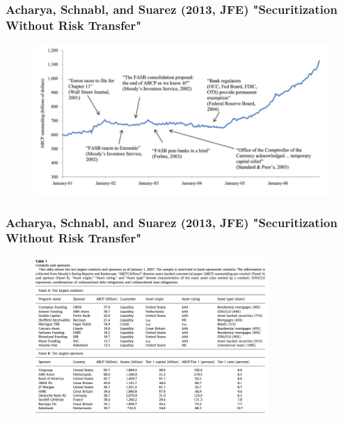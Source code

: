 \documentclass[11pt]{beamer}
\begin{document}
\begin{frame}
	\frametitle{Acharya, Schnabl, and Suarez (2013, JFE) "Securitization Without Risk Transfer"}
    \begin{figure}
    	\begin{center}
    	\includegraphics[width=\textwidth]{Figures/ASS2013_Figure2.png}
        \end{center}
    \end{figure}
\end{frame}

\begin{frame}
	\frametitle{Acharya, Schnabl, and Suarez (2013, JFE) "Securitization Without Risk Transfer"}
    \begin{figure}
    	\begin{center}
    	\includegraphics[width=0.8\textwidth]{Figures/ASS2013_Table1.png}
        \end{center}
    \end{figure}
\end{frame}
\end{document}
